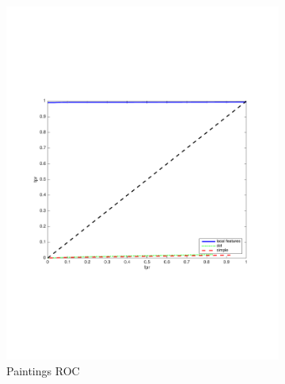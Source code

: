 \documentclass[english,12pt,a4paper,pdftex,elec,utf8, table]{aaltothesis}
\begin{document}
\begin{figure}[htb]
  \begin{center}
  \begin{subfigure}[b]{0.49\textwidth}
    \includegraphics[width=\textwidth]{figures/Rotate10ROC.pdf}
    \caption{Paintings ROC}
    \label{Rotateroc}
  \end{subfigure}
  \begin{subfigure}[b]{0.49\textwidth}

\end{subfigure}
\end{center}
\end{figure}
\end{document}
